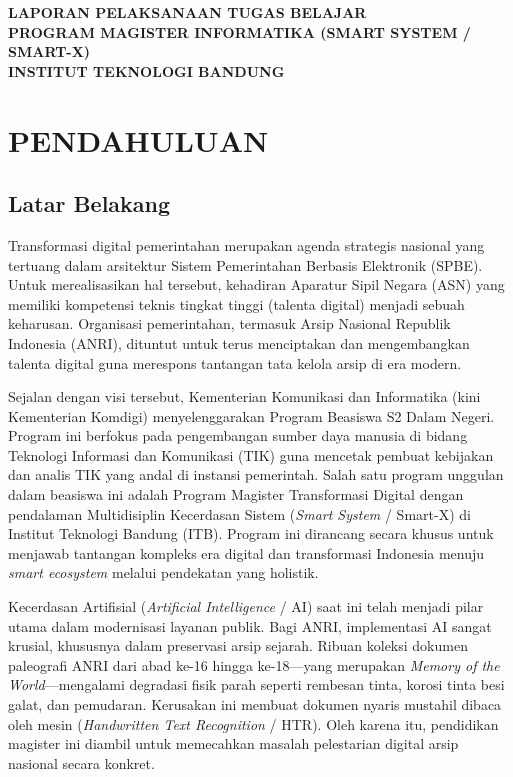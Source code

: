 \documentclass[11pt, a4paper]{article}
\begin{document}
\sloppy

\begin{center}
    \Large \textbf{LAPORAN PELAKSANAAN TUGAS BELAJAR}\\
    \large \textbf{PROGRAM MAGISTER INFORMATIKA (SMART SYSTEM / SMART-X)}\\
    \large \textbf{INSTITUT TEKNOLOGI BANDUNG}
\end{center}
\vspace{1cm}

\section{PENDAHULUAN}

\subsection{Latar Belakang}
Transformasi digital pemerintahan merupakan agenda strategis nasional yang tertuang dalam arsitektur Sistem Pemerintahan Berbasis Elektronik (SPBE). Untuk merealisasikan hal tersebut, kehadiran Aparatur Sipil Negara (ASN) yang memiliki kompetensi teknis tingkat tinggi (talenta digital) menjadi sebuah keharusan. Organisasi pemerintahan, termasuk Arsip Nasional Republik Indonesia (ANRI), dituntut untuk terus menciptakan dan mengembangkan talenta digital guna merespons tantangan tata kelola arsip di era modern.

Sejalan dengan visi tersebut, Kementerian Komunikasi dan Informatika (kini Kementerian Komdigi) menyelenggarakan Program Beasiswa S2 Dalam Negeri. Program ini berfokus pada pengembangan sumber daya manusia di bidang Teknologi Informasi dan Komunikasi (TIK) guna mencetak pembuat kebijakan dan analis TIK yang andal di instansi pemerintah. Salah satu program unggulan dalam beasiswa ini adalah Program Magister Transformasi Digital dengan pendalaman Multidisiplin Kecerdasan Sistem (\textit{Smart System} / Smart-X) di Institut Teknologi Bandung (ITB). Program ini dirancang secara khusus untuk menjawab tantangan kompleks era digital dan transformasi Indonesia menuju \textit{smart ecosystem} melalui pendekatan yang holistik.

Kecerdasan Artifisial (\textit{Artificial Intelligence} / AI) saat ini telah menjadi pilar utama dalam modernisasi layanan publik. Bagi ANRI, implementasi AI sangat krusial, khususnya dalam preservasi arsip sejarah. Ribuan koleksi dokumen paleografi ANRI dari abad ke-16 hingga ke-18---yang merupakan \textit{Memory of the World}---mengalami degradasi fisik parah seperti rembesan tinta, korosi tinta besi galat, dan pemudaran. Kerusakan ini membuat dokumen nyaris mustahil dibaca oleh mesin (\textit{Handwritten Text Recognition} / HTR). Oleh karena itu, pendidikan magister ini diambil untuk memecahkan masalah pelestarian digital arsip nasional secara konkret.
\end{document}
